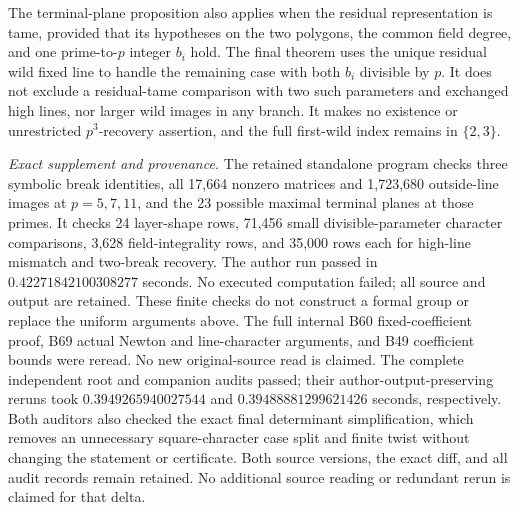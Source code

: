 \begin{remark}
\label{rem:B-RD82-scope}
The terminal-plane proposition also applies when the residual
representation is tame, provided that its hypotheses on the
two polygons, the common field degree, and one prime-to-\(p\)
integer \(b_i\) hold. The final theorem uses the unique
residual wild fixed line to handle the remaining case with
both \(b_i\) divisible by \(p\). It does not exclude a
residual-tame comparison with two such parameters and
exchanged high lines, nor larger wild images in any branch.
It makes no existence or unrestricted \(p^3\)-recovery
assertion, and the full first-wild index remains in \(\{2,3\}\).

\smallskip
\noindent\emph{Exact supplement and provenance.}
The retained standalone program
checks three symbolic break identities, all 17,664 nonzero
matrices and 1,723,680 outside-line images at \(p=5,7,11\),
and the 23 possible maximal terminal planes at those primes.
It checks 24 layer-shape rows, 71,456 small divisible-parameter
character comparisons, 3,628 field-integrality rows, and
35,000 rows each for high-line mismatch and two-break recovery.
The author run passed in \(0.42271842100308277\) seconds.
No executed computation failed; all source and output are
retained. These finite checks do not construct a formal
group or replace the uniform arguments above. The full
internal B60 fixed-coefficient proof, B69 actual Newton
and line-character arguments, and B49 coefficient bounds
were reread. No new original-source read is claimed.
The complete independent root and companion audits passed;
their author-output-preserving reruns took
\(0.3949265940027544\) and \(0.39488881299621426\) seconds,
respectively. Both auditors also checked the exact final
determinant simplification, which removes an unnecessary
square-character case split and finite twist without changing
the statement or certificate. Both source versions, the exact
diff, and all audit records remain retained. No additional
source reading or redundant rerun is claimed for that delta.
\end{remark}
